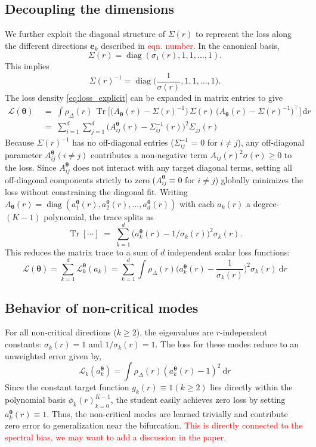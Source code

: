 \documentclass[11pt,a4paper]{article}
\theoremstyle{remark}
\newcommand{\btheta}{\boldsymbol{\theta}}
\newcommand{\be}{\mathbf{e}}
\newcommand{\Tr}{\operatorname{Tr}}
\newcommand{\diag}{\operatorname{diag}}
\newcommand{\rmd}{\textrm{d}}
\newcommand{\Th}{{\btheta}}
\def\sgp#1{{\sf\textcolor{red}{#1}}}
\begin{document}
\begin{onehalfspace}
\subsection{Decoupling the dimensions}

We further exploit the diagonal structure of $\Sigma(r)$ to represent the loss along the different directions $\be_k$ described in \sgp{eqn. number}. In the canonical basis,
\[
\Sigma(r) = \diag(\sigma_1(r), 1, 1, \ldots, 1).
\]
This implies 
\[
    \Sigma(r)^{-1} = \diag\bigg( \frac{1}{\sigma(r)},1,1, \ldots,1 \bigg).
\]
The loss density \eqref{eq:loss_explicit} can be expanded in matrix entries to give 
\begin{align}
    \mathcal{L}(\btheta) & \;=\;  \int \rho_\Delta(r)\, \Tr\!\Big[\big(A_\Th(r) - \Sigma(r)^{-1}\big)\, \Sigma(r)\, \big(A_\Th(r) - \Sigma(r)^{-1}\big)^\top \Big]\, \rmd r \nonumber \\    
                        & \;=\; \sum_{i=1}^{d}\sum_{j=1}^{d} \big(A^\Th_{ij}(r) - \Sigma_{ij}^{-1}(r)\big)^{2} \Sigma_{jj}(r) \label{eq:expanded_loss}
\end{align}
Because $\Sigma(r)^{-1}$ has no off-diagonal entries ($\Sigma_{ij}^{-1}$ = 0 for $i\neq j$), any off-diagonal parameter $A^\Th_{ij}(i\neq j)$ contributes a non-negative term $A_{ij}(r)^2\sigma(r)\geq 0$ to the loss. Since $A^\Th_{ij}$ does not interact with any target diagonal terms, setting all off-diagonal components strictly to zero ($A^\Th_{ij}\equiv 0$ for $i\neq j$) globally minimizes the loss without constraining the diagonal fit. Writing $A_\Th(r) = \diag(a^\Th_1(r), a^\Th_2(r), \ldots, a^\Th_d(r))$ with each $a_k(r)$ a degree-$(K-1)$ polynomial, the trace splits as
\[
\Tr[\cdots] \;=\; \sum_{k=1}^d \big(a^\Th_k(r) - 1/\sigma_k(r)\big)^2 \sigma_k(r).
\]
This reduces the matrix trace to a sum of $d$ independent scalar loss functions:
\begin{equation}\label{eq:complete_loss_fn}
    \mathcal{L}(\btheta) = \sum_{k=1}^{d}\mathcal{L}^\Th_k (a_k) = \sum_{k=1}^{d}\int \rho_{\Delta}(r)\Big(a^\Th_k(r)- \frac{1}{\sigma_k(r)}\Big)^2 \sigma_k(r) \ \rmd r
\end{equation}

\subsection{Behavior of non-critical modes}\label{subsec:noncrit_behavior}
For all non-critical directions ($k \geq 2$), the eigenvalues are $r$-independent constants: $\sigma_k(r)=1$ and $1/\sigma_k(r) =1$. The loss for these modes reduce to an unweighted error given by,
\begin{equation}\label{eq:non_crit_loss}
    \mathcal{L}_k(a^\Th_k)= \int \rho_{\Delta}(r)(a^\Th_k(r) - 1)^2\ \rmd r
\end{equation}
Since the constant target function $g_k(r) \equiv 1 (k\geq 2)$ lies directly within the polynomial basis ${\phi_k(r)}_{k=0}^{K-1}$, the student easily achieves zero loss by setting $a^\Th_k(r)\equiv 1$. Thus, the non-critical modes are learned trivially and contribute zero error to generalization near the bifurcation. \sgp{This is directly connected to the spectral bias, we may want to add a discussion in the paper.}


\end{onehalfspace}
\end{document}
